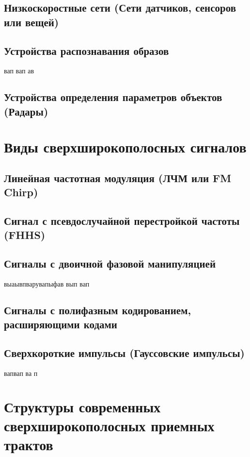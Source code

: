 \subsection{Низкоскоростные сети (Сети датчиков, сенсоров или вещей)}

\subsection{Устройства распознавания образов}
вап вап ав

\subsection{Устройства определения параметров объектов (Радары)}

\section{Виды сверхширокополосных сигналов}

\subsection{Линейная частотная модуляция (ЛЧМ или FM Chirp)}

\subsection{Сигнал с псевдослучайной перестройкой частоты (FHHS)}

\subsection{Сигналы с двоичной фазовой манипуляцией}
выаывпварувапыфав вып вап 

\subsection{Сигналы с полифазным кодированием, расширяющими кодами}

\subsection{Сверхкороткие импульсы (Гауссовские импульсы)}
вапвап ва п

\section{Структуры современных сверхширокополосных приемных трактов}

